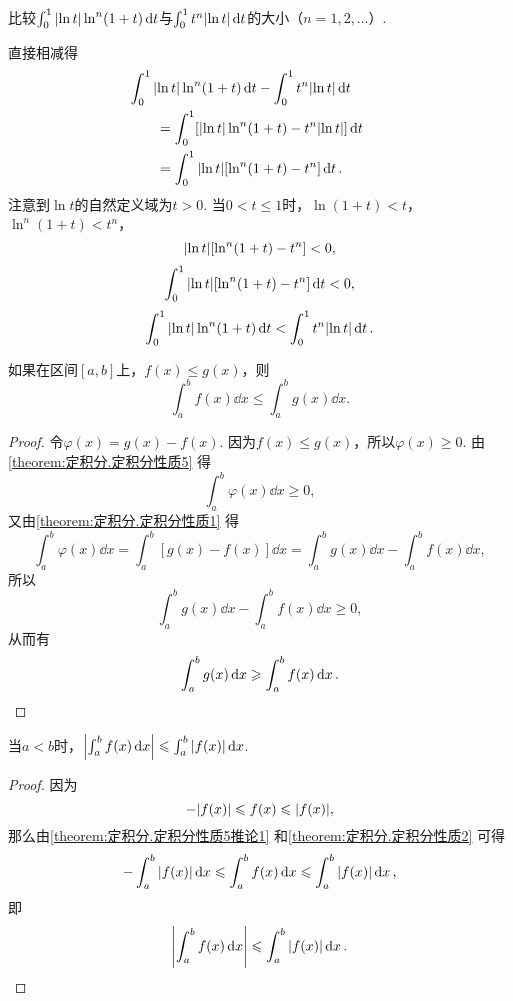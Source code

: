 \begin{example}
比较\(\int_0^1 \abs{\ln t} \ln^n(1+t) \dd{t}\)与\(\int_0^1 t^n \abs{\ln t} \dd{t}\)的大小（\(n=1,2,\dotsc\)）.
\begin{solution}
直接相减得
\begin{align*}
&\hspace{-20pt}
\int_0^1 \abs{\ln t} \ln^n(1+t) \dd{t} - \int_0^1 t^n \abs{\ln t} \dd{t} \\
&= \int_0^1 [\abs{\ln t} \ln^n(1+t) - t^n \abs{\ln t}] \dd{t} \\
&= \int_0^1 \abs{\ln t} [\ln^n(1+t) - t^n] \dd{t}.
\end{align*}
注意到\(\ln t\)的自然定义域为\(t > 0\).
当\(0 < t \leqslant 1\)时，\(\ln(1+t) < t\)，\(\ln^n(1+t) < t^n\)，\[
\abs{\ln t} [\ln^n(1+t) - t^n] < 0,
\]\[
\int_0^1 \abs{\ln t} [\ln^n(1+t) - t^n] \dd{t} < 0,
\]\[
\int_0^1 \abs{\ln t} \ln^n(1+t) \dd{t} < \int_0^1 t^n \abs{\ln t} \dd{t}.
\]
\end{solution}
\end{example}

\begin{corollary}\label{theorem:定积分.定积分性质5推论1}
如果在区间\([a,b]\)上，\(f(x) \leqslant g(x)\)，则\[
\int_a^b f(x) \dd{x} \leqslant \int_a^b g(x) \dd{x}.
\]
\begin{proof}
令\(\varphi(x) = g(x) - f(x)\).
因为\(f(x) \leqslant g(x)\)，所以\(\varphi(x) \geqslant 0\).
由\cref{theorem:定积分.定积分性质5} 得\[
\int_a^b \varphi(x) \dd{x} \geqslant 0,
\]又由\cref{theorem:定积分.定积分性质1} 得\[
\int_a^b \varphi(x) \dd{x}
= \int_a^b [g(x) - f(x)] \dd{x}
= \int_a^b g(x) \dd{x} - \int_a^b f(x) \dd{x},
\]所以\[
\int_a^b g(x) \dd{x} - \int_a^b f(x) \dd{x} \geqslant 0,
\]从而有\[
\int_a^b g(x) \dd{x} \geqslant \int_a^b f(x) \dd{x}.
\qedhere
\]
\end{proof}
\end{corollary}

\begin{corollary}\label{theorem:定积分.定积分性质5推论2}
当\(a<b\)时，\(\abs{\int_a^b f(x) \dd{x}} \leqslant \int_a^b \abs{f(x)} \dd{x}\).
\begin{proof}
因为\[
-\abs{f(x)} \leqslant f(x) \leqslant \abs{f(x)},
\]那么由\cref{theorem:定积分.定积分性质5推论1} 和\cref{theorem:定积分.定积分性质2} 可得\[
-\int_a^b \abs{f(x)} \dd{x}
\leqslant
\int_a^b f(x) \dd{x}
\leqslant
\int_a^b \abs{f(x)} \dd{x},
\]即\[
\abs{\int_a^b f(x) \dd{x}} \leqslant \int_a^b \abs{f(x)} \dd{x}.
\qedhere
\]
\end{proof}
\end{corollary}

